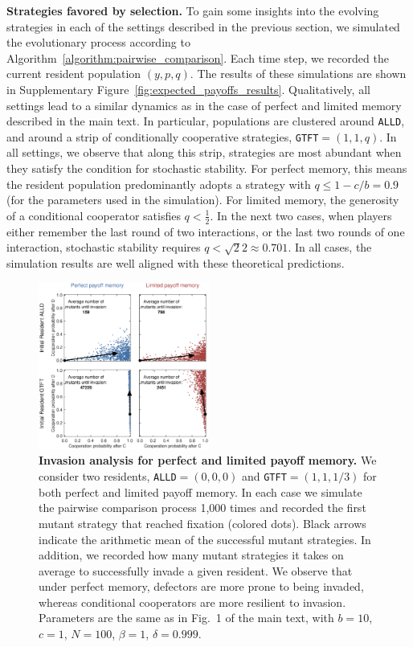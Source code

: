 \documentclass[11pt]{article}
\def\alld{\texttt{ALLD}}
\def\gtft{\texttt{GTFT}}
\theoremstyle{plainCl1}
\theoremstyle{plainCl2}
\begin{document}
{\bf Strategies favored by selection.} 
To gain some insights into the evolving strategies in each of the settings described in the previous section, we simulated the evolutionary process according to Algorithm~\ref{algorithm:pairwise_comparison}. 
Each time step, we recorded the current resident population \((y, p, q)\). 
The results of these simulations are shown in Supplementary Figure~\ref{fig:expected_payoffs_results}. 
Qualitatively, all settings lead to a similar dynamics as in the case of perfect and limited memory described in the main text. 
In particular, populations are clustered around \alld, and around a strip of conditionally cooperative strategies, \gtft$=\!(1,1,q)$. 
In all settings, we observe that along this strip, strategies are most abundant when they satisfy the condition for stochastic stability. 
For perfect memory, this means the resident population predominantly adopts a strategy with \(q\! \leq\! 1 \!-\!
c/b\!=\!0.9\) (for the parameters used in the simulation). 
For limited memory, the generosity of a conditional cooperator satisfies  \(q\!<\!\frac{1}{2}\). 
In the next two cases, when players either remember the last round of two interactions, or the last two rounds of one interaction, stochastic stability requires $q\!<\!\sqrt{2}{2}\!\approx\!0.701$. 
In all cases, the simulation results are well aligned with these theoretical predictions.\\



\begin{figure}[t!]
    \centering    
     \includegraphics[width=0.5\textwidth]{static/invasion_analysis.eps}
    \caption{\textbf{Invasion analysis for perfect and limited payoff memory.} We consider two residents, \alld{}$=(0,0,0)$ and \gtft$=(1,1,1/3)$ for both perfect and limited payoff memory. In each case we simulate the pairwise comparison process 1,000 times and recorded the first mutant strategy that reached fixation (colored dots). Black arrows indicate the arithmetic mean of the successful mutant strategies. In addition, we recorded how many mutant strategies it takes on average to successfully invade a given resident. We observe that under perfect memory, defectors are more prone to being invaded, whereas conditional cooperators are more resilient to invasion. Parameters are the same as in Fig.~1 of the main text, with $b\!=\!10$, $c\!=\!1$, $N\!=\!100$, $\beta\!=\!1$, $\delta\!=\!0.999$.}
    \label{fig:invasion_analysis}
\end{figure}
\end{document}
